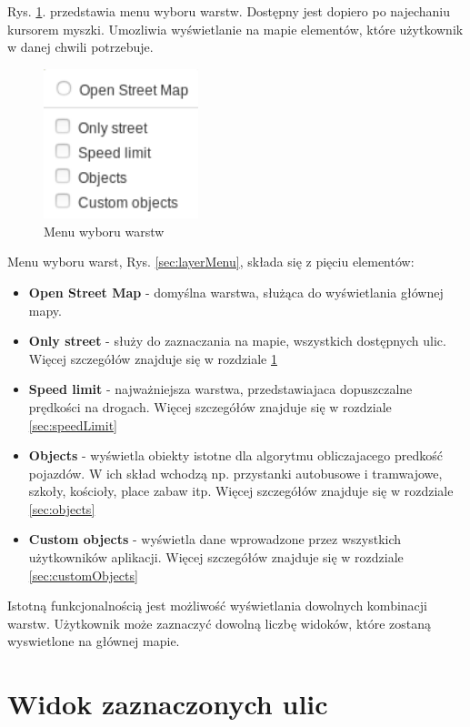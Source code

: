 Rys. \ref{sec:mainView}. przedstawia menu wyboru warstw. Dostępny jest dopiero po najechaniu kursorem myszki. Umozliwia wyświetlanie na mapie elementów, które użytkownik w danej chwili potrzebuje. 

\begin{figure}[h]
\caption{Menu wyboru warstw}
\label{sec:mainView}
\centering
\includegraphics[width=0.4\textwidth]{layerMenu}
\end{figure}

Menu wyboru warst, Rys. \ref{sec:layerMenu}, składa się z pięciu elementów:
\begin{itemize}
\item \textbf{Open Street Map} - domyślna warstwa, służąca do wyświetlania głównej mapy.
\item \textbf{Only street} - służy do zaznaczania na mapie, wszystkich dostępnych ulic. Więcej szczegółów znajduje się w rozdziale \ref{sec:onlyStreet}
\item \textbf{Speed limit} - najważniejsza warstwa, przedstawiajaca dopuszczalne prędkości na drogach. Więcej szczegółów znajduje się w rozdziale \ref{sec:speedLimit}
\item \textbf{Objects} - wyświetla obiekty istotne dla algorytmu obliczajacego predkość pojazdów. W ich skład wchodzą np. przystanki autobusowe i tramwajowe, szkoły, kościoły, place zabaw itp. Więcej szczegółów znajduje się w rozdziale \ref{sec:objects}
\item \textbf{Custom objects} - wyświetla dane wprowadzone przez wszystkich użytkowników aplikacji. Więcej szczegółów znajduje się w rozdziale \ref{sec:customObjects}
\end{itemize}

Istotną funkcjonalnością jest możliwość wyświetlania dowolnych kombinacji warstw. Użytkownik może zaznaczyć dowolną liczbę widoków, które zostaną wyswietlone na głównej mapie.

\newpage
\section{Widok zaznaczonych ulic}
\label{sec:onlyStreet}

